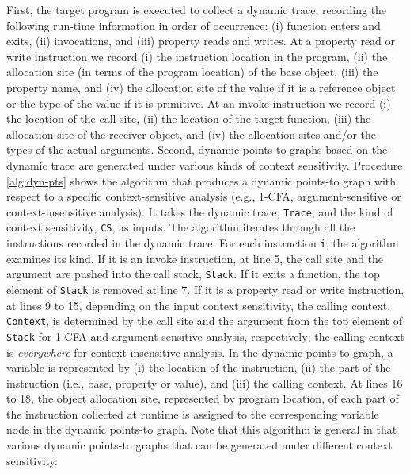 First, the target program is executed to collect a dynamic trace, recording the following run-time information in order of occurrence: (i) function enters and exits, (ii) invocations, and (iii) property reads and writes. At a property read or write instruction we record (i) the instruction location in the program, (ii) the allocation site (in terms of the program location) of the base object, (iii) the property name, and (iv) the allocation site of the value if it is a reference object or the type of the value if it is primitive. At an invoke instruction we record (i) the location of the call site, (ii) the location of the target function, (iii) the allocation site of the receiver object, and (iv) the allocation sites and/or the types of the actual arguments. Second, dynamic points-to graphs based on the dynamic trace are generated under various kinds of context sensitivity. Procedure \ref{alg:dyn-pts} shows the algorithm that produces a dynamic points-to graph with respect to a specific context-sensitive analysis (e.g., 1-CFA, argument-sensitive or context-insensitive analysis). It takes the dynamic trace, {\tt Trace}, and the kind of context sensitivity, {\tt CS}, as inputs. The algorithm iterates through all the instructions recorded in the dynamic trace. For each instruction {\tt i}, the algorithm examines its kind. If it is an invoke instruction, at line 5, the call site and the argument are pushed into the call stack, {\tt Stack}. If it exits a function, the top element of {\tt Stack} is removed  at line 7. If it is a property read or write instruction, at lines 9 to 15, depending on the input context sensitivity, the calling context, {\tt Context}, is determined by the call site and the argument from the top element of {\tt Stack} for 1-CFA and argument-sensitive analysis, respectively; the calling context is {\it everywhere} for context-insensitive analysis. In the dynamic points-to graph, a variable is represented by (i) the location of the instruction, (ii) the part of the instruction (i.e., base, property or value), and (iii) the calling context. At lines 16 to 18, the object allocation site, represented by program location, of each part of the instruction collected at runtime is assigned to the corresponding variable node in the dynamic points-to graph. Note that this algorithm is general in that various dynamic points-to graphs that can be generated under different context sensitivity.

